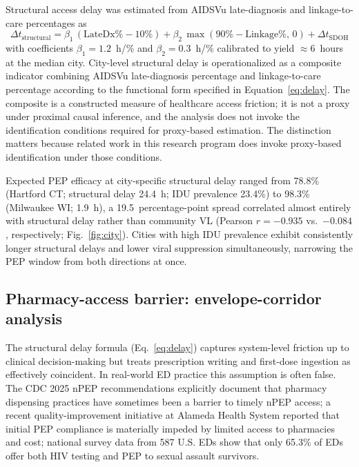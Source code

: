 \documentclass[10pt,letterpaper]{article}
\theoremstyle{definition}
\theoremstyle{remark}
\begin{document}
Structural access delay was estimated from AIDSVu late-diagnosis and linkage-to-care percentages as
\begin{equation}
\Delta t_{\text{structural}} = \beta_{1}\,(\text{LateDx}\% - 10\%) + \beta_{2}\,\max(90\% - \text{Linkage}\%,\, 0) + \Delta t_{\text{SDOH}}
\label{eq:delay}
\end{equation}
with coefficients $\beta_{1} = 1.2$~h/\% and $\beta_{2} = 0.3$~h/\% calibrated to yield $\approx$6~hours at the median city. City-level structural delay is operationalized as a composite indicator combining AIDSVu late-diagnosis percentage and linkage-to-care percentage according to the functional form specified in Equation~\ref{eq:delay}. The composite is a constructed measure of healthcare access friction; it is not a proxy under proximal causal inference\cite{tchetgentchetgen2020}, and the analysis does not invoke the identification conditions required for proxy-based estimation\cite{pearl2009}. The distinction matters because related work in this research program does invoke proxy-based identification under those conditions.

Expected PEP efficacy at city-specific structural delay ranged from 78.8\% (Hartford CT; structural delay 24.4~h; IDU prevalence 23.4\%) to 98.3\% (Milwaukee WI; 1.9~h), a 19.5~percentage-point spread correlated almost entirely with structural delay rather than community VL (Pearson $r = -0.935$ vs.\ $-0.084$, respectively; Fig.~\ref{fig:city}). Cities with high IDU prevalence exhibit consistently longer structural delays and lower viral suppression simultaneously, narrowing the PEP window from both directions at once.

\subsection*{Pharmacy-access barrier: envelope-corridor analysis}

The structural delay formula (Eq.~\ref{eq:delay}) captures system-level friction up to clinical decision-making but treats prescription writing and first-dose ingestion as effectively coincident. In real-world ED practice this assumption is often false. The CDC 2025 nPEP recommendations explicitly document that pharmacy dispensing practices have sometimes been a barrier to timely nPEP access\cite{tanner2025}; a recent quality-improvement initiative at Alameda Health System reported that initial PEP compliance is materially impeded by limited access to pharmacies and cost\cite{white2025nPEP}; national survey data from 587 U.S. EDs show that only 65.3\% of EDs offer both HIV testing and PEP to sexual assault survivors\cite{lopezcastillo2020,white2025nPEP}.
\end{document}
